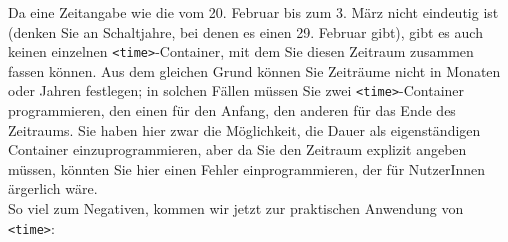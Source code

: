 Da eine Zeitangabe wie die vom 20. Februar bis zum 3. März nicht eindeutig ist (denken Sie an Schaltjahre, bei denen es einen 29. Februar gibt), gibt es auch keinen einzelnen \verb|<time>|-Container, mit dem Sie diesen Zeitraum zusammen fassen können. Aus dem gleichen Grund können Sie Zeiträume nicht in Monaten oder Jahren festlegen; in solchen Fällen müssen Sie zwei \verb|<time>|-Container programmieren, den einen für den Anfang, den anderen für das Ende des Zeitraums. Sie haben hier zwar die Möglichkeit, die Dauer als eigenständigen Container einzuprogrammieren, aber da Sie den Zeitraum explizit angeben müssen, könnten Sie hier einen Fehler einprogrammieren, der für NutzerInnen ärgerlich wäre.\\

So viel zum Negativen, kommen wir jetzt zur praktischen Anwendung von \verb|<time>|:

